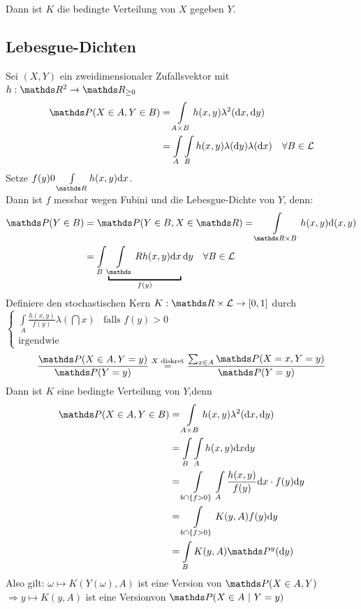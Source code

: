 Dann ist $K$ die bedingte Verteilung von $X$ gegeben $Y$.
\newpage

\subsection{Lebesgue-Dichten}
\label{sub:lebesgue_dichten}
Sei $(X,Y)$ ein zweidimensionaler Zufallsvektor mit  $h:\R^2\to \R_{\ge 0}$\\
\begin{equation*}
\begin{aligned}
	\Pw(X\in A,Y\in B) &= \int\limits_{A\times B}h(x,y)\lambda^2(\dint x,\dint y)\\
	&= \int\limits_A\int\limits_B h(x,y) \lambda(\dint y)\lambda(\dint x)\quad \forall B\in \mathcal{L}
\end{aligned}
\end{equation*}
Setze $f(y)0\int\limits_{\R}h(x,y)\dint x$.\\
Dann ist $f$ messbar wegen Fubini und die Lebesgue-Dichte von $Y$, denn:
\begin{equation*}
\begin{aligned}
	\Pw(Y\in B) &= \Pw(Y\in B,X\in \R)= \int\limits_{\R\times B}h(x,y)\dint(x,y)\\
	&=\int\limits_B\underbracket{\int\limits_\R h(x,y)\dint x}_{f(y)}\dint y \quad \forall B\in \mathcal{L}
\end{aligned}
\end{equation*}
Definiere den stochastischen Kern $K:\R\times \mathcal{L}\to[0,1]$ durch
$\left\{\begin{array}{cl} \int\limits_A \frac{h(x,y)}{f(y)}\lambda(\dint x) & \text{falls } f(y)>0\\ \text{irgendwie}    \end{array}\right.$
\[ \frac{\Pw(X\in A,Y=y)}{\Pw(Y=y)}\stackrel{X\text{ diskret}}{=} \frac{\sum_{x\in A}\Pw(X=x,Y=y)}{\Pw(Y=y)} \]
Dann ist $K$ eine bedingte Verteilung von $Y$,denn
\begin{equation*}
\begin{aligned}
	\Pw(X\in A,Y\in B) &= \int\limits_{A\times B} h(x,y)\lambda^2(\dint x, \dint y)\\
	&= \int\limits_B\int\limits_Ah(x,y)\dint x \dint y\\
	&= \int\limits_{b\cap\{f>0\}}\int\limits_A \frac{h(x,y)}{f(y)}\dint x \cdot f(y)\dint y\\
	&= \int\limits_{b\cap\{f>0\}}K(y,A)f(y)\dint y\\
	&= \int\limits_BK(y,A)\Pw^y(\dint y)
\end{aligned}
\end{equation*}
Also gilt: $\omega\mapsto K(Y(\omega),A)$ ist eine Version von $\Pw(X\in A,Y)$\\
$\Rightarrow y\mapsto K(y,A)$ ist eine Versionvon $\Pw(X\in A~|~Y=y)$









\cleardoubleoddemptypage
{}
\setcounter{page}{1}



\printindex
\listoffigures
